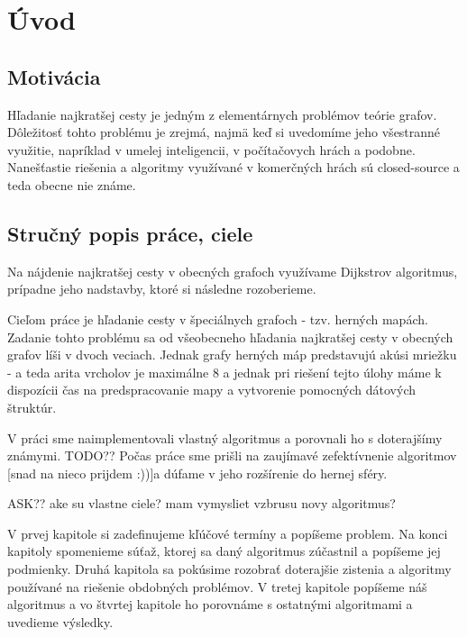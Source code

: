 \chapter*{Úvod}

\section{Motivácia}
Hľadanie najkratšej cesty je jedným z elementárnych problémov teórie grafov.
Dôležitosť tohto problému je zrejmá, najmä keď si uvedomíme jeho všestranné využitie, napríklad v 
umelej inteligencii, v počítačovych hrách a podobne. Nanešťastie riešenia a algoritmy využívané v komerčných hrách 
sú closed-source a teda obecne nie známe.

\section{Stručný popis práce, ciele}
Na nájdenie najkratšej cesty v obecných grafoch využívame Dijkstrov algoritmus, prípadne jeho nadstavby, ktoré si následne rozoberieme.

Cieľom práce je hľadanie cesty v špeciálnych grafoch - tzv. herných mapách. 
Zadanie tohto problému sa od všeobecneho hľadania najkratšej cesty v obecných grafov líši v dvoch veciach.
Jednak grafy herných máp predstavujú akúsi mriežku - a teda arita vrcholov je maximálne 8 a jednak pri riešení tejto úlohy máme k dispozícii čas
na predspracovanie mapy a vytvorenie pomocných dátových štruktúr.


V práci sme naimplementovali vlastný algoritmus a porovnali ho s doterajšímy známymi.
TODO?? Počas práce sme prišli na zaujímavé zefektívnenie algoritmov [snad na nieco prijdem :))]a dúfame v jeho rozšírenie do hernej sféry.

ASK?? ake su vlastne ciele? mam vymysliet vzbrusu novy algoritmus?

V prvej kapitole si zadefinujeme kľúčové termíny a popíšeme problem. Na konci kapitoly spomenieme súťaž, ktorej sa daný algoritmus zúčastnil 
a popíšeme jej podmienky.
Druhá kapitola sa pokúsime rozobrať doterajšie zistenia a algoritmy používané na riešenie obdobných problémov.
V tretej kapitole popíšeme náš algoritmus a vo štvrtej kapitole ho porovnáme s ostatnými algoritmami a uvedieme výsledky.

